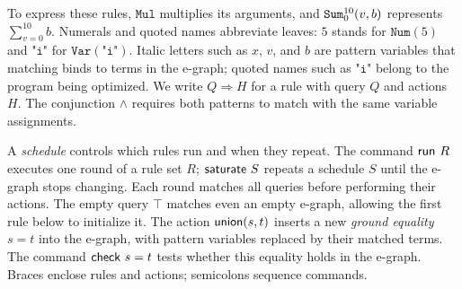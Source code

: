 To express these rules, $\mathtt{Mul}$ multiplies its arguments,
  and $\mathtt{Sum}_{0}^{10}(v,b)$ represents $\sum_{v=0}^{10}b$.
Numerals and quoted names abbreviate leaves:
  $5$ stands for $\mathtt{Num}(5)$ and $\texttt{"i"}$ for $\mathtt{Var}(\texttt{"i"})$.
Italic letters such as $x$, $v$, and $b$ are pattern variables
  that matching binds to terms in the e-graph;
  quoted names such as $\texttt{"i"}$ belong to the program being optimized.
We write $Q\Rightarrow H$ for a rule with query $Q$ and actions $H$.
The conjunction $\land$ requires both patterns to match with the same variable assignments.

A \emph{schedule} controls which rules run and when they repeat.
The command $\mathsf{run}\ R$ executes one round of a rule set $R$;
  $\mathsf{saturate}\ S$ repeats a schedule $S$ until the e-graph stops changing.
Each round matches all queries before performing their actions.
The empty query $\top$ matches even an empty e-graph,
  allowing the first rule below to initialize it.
The action $\mathsf{union}(s,t)$ inserts a new \emph{ground equality} $s=t$ into the e-graph,
  with pattern variables replaced by their matched terms.
The command $\mathsf{check}\ s=t$ tests whether this equality holds in the e-graph.
Braces enclose rules and actions; semicolons sequence commands.

